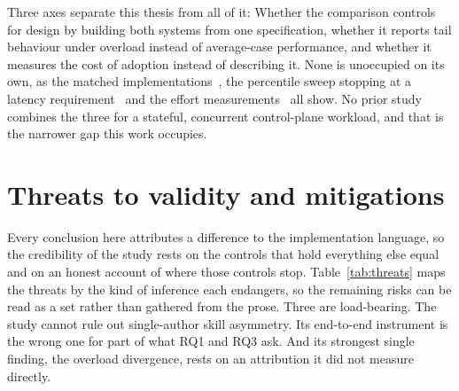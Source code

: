 Three axes separate this thesis from all of it: Whether the comparison controls for design by
building both systems from one specification, whether it reports tail behaviour under overload
instead of average-case performance, and whether it measures the cost of adoption instead of
describing it. None is unoccupied on its own, as the matched
implementations~\cite{emmerich2019drivers,li2021ipc,narayanan2020redleaf,suchert2023stamp,gonzalez2023rustudp,pirelli2023safelowlevel,emberg2023asn1},
the percentile sweep stopping at a latency requirement~\cite{arvidsson2025async} and the effort
measurements~\cite{karlback2021ran,fulton2021adopting} all show. No prior study combines the
three for a stateful, concurrent control-plane workload, and that is the narrower gap this work
occupies.

\section{Threats to validity and mitigations}\label{sec:threats}
Every conclusion here attributes a difference to the implementation language, so the credibility
of the study rests on the controls that hold everything else equal and on an honest account of
where those controls stop. Table~\ref{tab:threats} maps the threats by the kind of inference each
endangers, so the remaining risks can be read as a set rather than gathered from the prose. Three
are load-bearing. The study cannot rule out single-author skill asymmetry. Its end-to-end
instrument is the wrong one for part of what RQ1 and RQ3 ask. And its strongest single finding,
the overload divergence, rests on an attribution it did not measure directly.

